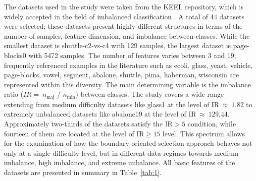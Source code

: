 \documentclass[pdflatex]{sn-jnl}
\begin{document}
The datasets used in the study were taken from the KEEL repository, which is widely accepted in the field of imbalanced classification \cite{ref43} \cite{ref44}. A total of 44 datasets were selected; these datasets present highly different structures in terms of the number of samples, feature dimension, and imbalance between classes. While the smallest dataset is shuttle-c2-vs-c4 with 129 samples, the largest dataset is page-blocks0 with 5472 samples. The number of features varies between 3 and 19; frequently referenced examples in the literature such as ecoli, glass, yeast, vehicle, page-blocks, vowel, segment, abalone, shuttle, pima, haberman, wisconsin are represented within this diversity. The main determining variable is the imbalance ratio (\(IR = \ n_{\text{maj}}\) / \(n_{\text{min}}\)) between classes. The study covers a wide range extending from medium difficulty datasets like glass1 at the level of \(\text{IR}\  \approx \ 1.82\) to extremely unbalanced datasets like abalone19 at the level of \(\text{IR}\  \approx \ 129.44\). Approximately two-thirds of the datasets satisfy the \(\text{IR} > 5\) condition, while fourteen of them are located at the level of \(\text{IR} \geq 15\) level. This spectrum allows for the examination of how the boundary-oriented selection approach behaves not only at a single difficulty level, but in different data regimes towards medium imbalance, high imbalance, and extreme imbalance. All basic features of the datasets are presented in summary in Table~\ref{tab:1}.

\clearpage
\end{document}
